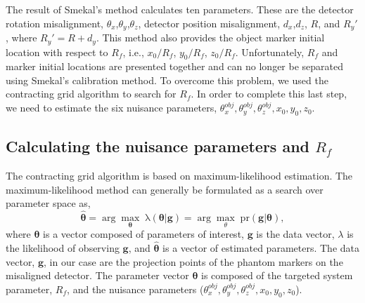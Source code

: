 The result of Smekal's method calculates ten parameters.  These are the detector rotation misalignment, $\theta_x$,$\theta_y$,$\theta_z$, detector position misalignment, $d_x$,$d_z$, $R$, and $R_y'$, where $R_y' = R + d_y$.  This method also provides the object marker initial location with respect to $R_f$, i.e., $x_0/R_f$, $y_0/R_f$, $z_0/R_f$.  Unfortunately, $R_f$ and marker initial locations are presented together and can no longer be separated using Smekal's calibration method.  To overcome this problem, we used the contracting grid algorithm to search for $R_f$.  In order to complete this last step, we need to estimate the six nuisance parameters, $\theta_x^{obj}, \theta_y^{obj}, \theta_z^{obj}, x_0, y_0, z_0$.


\subsection{Calculating the nuisance parameters and $R_{f}$}
The contracting grid algorithm is based on maximum-likelihood estimation.  The maximum-likelihood method can generally be formulated as a search over parameter space as,
%
\begin{equation}
\label{eq:mlem}
\mathrm{\boldsymbol{\hat{\theta}}} = \arg\max_{\mathbf{\theta}} \; \mathrm{\lambda (\boldsymbol{\theta} | \mathbf{g})} = \arg\max_{\theta} \; \mathrm{pr( \mathbf{g}|\boldsymbol{\theta})},
\end{equation}
%
where $\boldsymbol{\theta}$ is a vector composed of parameters of interest, $\mathbf{g}$ is the data vector, $\lambda$ is the likelihood of observing $\mathbf{g}$, and $\boldsymbol{\hat{\theta}}$ is a vector of estimated parameters.  The data vector, $\mathbf{g}$, in our case are the projection points of the phantom markers on the misaligned detector. The parameter vector $\boldsymbol{\theta}$ is composed of the targeted system parameter, $R_f$, and the nuisance parameters ($\theta_x^{obj}, \theta_y^{obj}, \theta_z^{obj}, x_0, y_0, z_0$).


